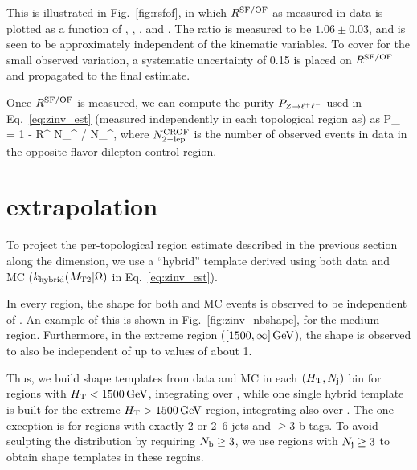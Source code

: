 This is illustrated in Fig.~\ref{fig:rsfof}, in which $R^{\mathrm{SF/OF}}$ as measured in data is plotted
as a function of \Ht, \mttwo, \Nj, and \Nb. The ratio is measured to be $1.06\pm0.03$, and is seen to 
be approximately independent of the kinematic variables. To cover for the small observed variation, 
a systematic uncertainty of 0.15 is placed on $R^{\mathrm{SF/OF}}$ and propagated to the final estimate.

Once $R^{\mathrm{SF/OF}}$ is measured, we can compute the purity $P_{Z\to\ell^+\ell^-}$ used in Eq.~\ref{eq:zinv_est} 
(measured independently in each topological region as) as
\be
P_{\zll} = 1 - R^ N_^ / N_^,
\ee
where $N_{\mathrm{2-lep}}^{\mathrm{CROF}}$ is the number of observed events in data in the opposite-flavor
dilepton control region.



\section{\texorpdfstring{\mttwo}{MT2} extrapolation}
\label{sec:zinv_mt2}

To project the per-topological region estimate described in the previous section along the \mttwo dimension, we use
a ``hybrid'' \mttwo template derived using both data and MC ($k_{\mathrm{hybrid}}(M_{\mathrm{T2}}|\Omega)$ in Eq.~\ref{eq:zinv_est}).

In every \Ht region, the \mttwo shape for both \znunu and \zll MC events is observed to be independent of \Nb.
An example of this is shown in Fig.~\ref{fig:zinv_nbshape}, for the medium \Ht region. Furthermore,
in the extreme \Ht region ($[1500,\infty]\,\text{Ge\hspace{-.08em}V}$), the \mttwo shape is observed to also be independent of \Nj
up to \mttwo values of about 1\TeV.

Thus, we build \mttwo shape templates from data and MC in each $(H_{\mathrm{T}},N_{\mathrm{j}})$ bin for regions
with $H_{\mathrm{T}}<1500\,\text{Ge\hspace{-.08em}V}$, integrating over \Nb, while one single hybrid template is built for the
extreme $H_{\mathrm{T}}>1500\,\text{Ge\hspace{-.08em}V}$ region, integrating also over \Nj. The one exception is for regions with
exactly 2 or 2--6 jets and $\geq$3 b tags. To avoid sculpting the \Nj distribution by requiring
$N_{\mathrm{b}}\geq3$, we use regions with $N_{\mathrm{j}}\geq3$ to obtain \mttwo shape templates in these regoins.

